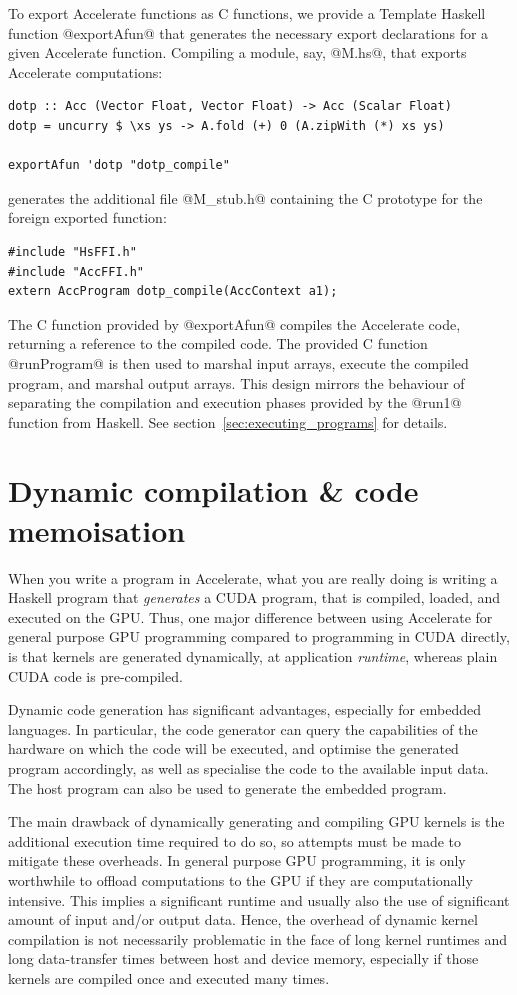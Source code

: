 To export Accelerate functions as C functions, we provide a Template
Haskell~\cite{Sheard:2002wu} function @exportAfun@ that generates the necessary
export declarations for a given Accelerate function. Compiling a module, say,
@M.hs@, that exports Accelerate computations:
%
\begin{lstlisting}[style=haskell]
dotp :: Acc (Vector Float, Vector Float) -> Acc (Scalar Float)
dotp = uncurry $ \xs ys -> A.fold (+) 0 (A.zipWith (*) xs ys)

exportAfun 'dotp "dotp_compile"
\end{lstlisting}
%
generates the additional file @M_stub.h@ containing the C prototype for the
foreign exported function:
%
\begin{lstlisting}[style=cuda]
#include "HsFFI.h"
#include "AccFFI.h"
extern AccProgram dotp_compile(AccContext a1);
\end{lstlisting}
%
The C function provided by @exportAfun@ compiles the Accelerate code, returning
a reference to the compiled code. The provided C function @runProgram@ is then
used to marshal input arrays, execute the compiled program, and marshal output
arrays. This design mirrors the behaviour of separating the compilation and
execution phases provided by the @run1@ function from Haskell. See
section~\ref{sec:executing_programs} for details.


\section{Dynamic compilation \& code memoisation}
\label{sec:dynamic_compilation}

When you write a program in Accelerate, what you are really doing is writing a
Haskell program that \emph{generates} a CUDA program, that is compiled,
loaded, and executed on the GPU\@. Thus, one major difference between using
Accelerate for general purpose GPU programming compared to programming in
CUDA directly, is that kernels are generated dynamically, at application
\emph{runtime}, whereas plain CUDA code is pre-compiled.

Dynamic code generation has significant advantages, especially for embedded
languages. In particular, the code generator can query the capabilities of the
hardware on which the code will be executed, and optimise the generated program
accordingly, as well as specialise the code to the available input data. The
host program can also be used to generate the embedded program.

The main drawback of dynamically generating and compiling GPU kernels is the
additional execution time required to do so, so attempts must be made to
mitigate these overheads. In general purpose GPU programming, it is only
worthwhile to offload computations to the GPU if they are computationally
intensive. This implies a significant runtime and usually also the use of
significant amount of input and/or output data. Hence, the overhead of dynamic
kernel compilation is not necessarily problematic in the face of long kernel
runtimes and long data-transfer times between host and device memory, especially
if those kernels are compiled once and executed many times.

